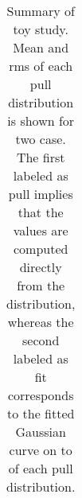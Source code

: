 \begin{table}
\begin{tabular}{c c c c c | c}
  \end{tabular}
  \caption{Summary of toy study. Mean and rms of each pull distribution is shown for two case.
           The first labeled as pull implies that the values are computed directly from the distribution,
           whereas the second labeled as fit corresponds to the fitted Gaussian curve on to of each pull distribution.}
  \label{pull_table}
\end{table}


























